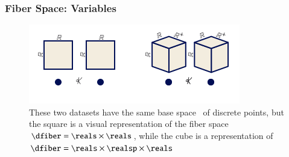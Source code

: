 \documentclass[journal]{vgtc}                %
\begin{document}
\subsubsection{Fiber Space: Variables}
\label{sec:math:data:fiber}
\begin{figure}[htb]
  \centering %
  \includegraphics[width=\columnwidth]{fiber.png}
  \caption{These two datasets have the same base space \dbase\ of discrete points, but the square is a visual representation of the fiber space  $\dfiber=\reals\times\reals$, while the cube is a representation of $\dfiber=\reals\times\realsp\times\reals$}
  \label{fig:math:data:fiber}
\end{figure}
\end{document}
